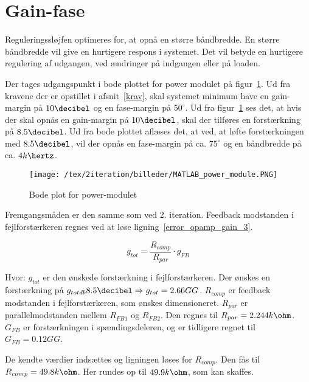 

\section{Gain-fase}
Reguleringssløjfen optimeres for, at opnå en større båndbredde. En større båndbredde vil give en hurtigere respons i systemet. Det vil betyde en hurtigere regulering af udgangen, ved ændringer på indgangen eller på loaden. 

Der tages udgangspunkt i bode plottet for power modulet på figur~\ref{fig:MATLAB_power_module}. Ud fra kravene der er opstillet i afsnit~\ref{krav}, skal systemet minimum have en gain-margin på $10\decibel$ og en fase-margin på $50^\circ$. Ud fra figur~\ref{fig:MATLAB_power_module} ses det, at hvis der skal opnås en gain-margin på $10\decibel$, skal der tilføres en forstærkning på $8.5\decibel$. Ud fra bode plottet aflæses det, at ved, at løfte forstærkningen med $8.5\decibel$, vil der opnås en fase-margin på ca. $75^\circ$ og en båndbredde på ca. $4k\hertz$. 

\begin{figure}[H]
	\center
	\texttt{[image: /tex/2iteration/billeder/MATLAB\_power\_module.PNG]}
	\caption{Bode plot for power-modulet}
	\label{fig:MATLAB_power_module}
\end{figure}

\noindent Fremgangsmåden er den samme som ved 2. iteration. Feedback modstanden i fejlforstærkeren regnes ved at løse ligning~\ref{error_opamp_gain_3}.

\begin{equation} \label{error_opamp_gain_3}
g_{tot} = \frac{R_{comp}}{R_{par}} \cdot g_{FB}
\end{equation}

\noindent Hvor:
\newline \noindent $g_{tot}$ er den ønskede forstærkning i fejlforstærkeren. Der ønskes en forstærkning på $g_{totdb}8.5\decibel \Rightarrow g_{tot}=2.66GG$.
\newline \noindent $R_{comp}$ er feedback modstanden i fejlforstærkeren, som ønskes dimensioneret.
\newline \noindent $R_{par}$ er parallelmodstanden mellem $R_{FB1}$ og $R_{FB2}$. Den regnes til $R_{par}=2.244k\ohm$.
\newline \noindent $G_{FB}$ er forstærkningen i spændingsdeleren, og er tidligere regnet til $G_{FB}=0.12GG$.

\noindent De kendte værdier indsættes og ligningen løses for $R_{comp}$. Den fås til $R_{comp} = 49.8k\ohm$. Her rundes op til $49.9k\ohm$, som kan skaffes.

